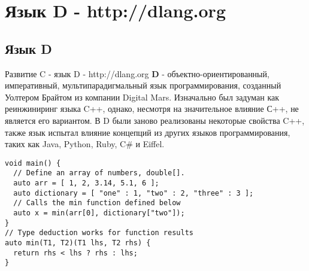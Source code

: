 \section{Язык D - http://dlang.org}
\subsection{Язык D}

\begin{frame}[t,fragile]{Развитие C - язык D - http://dlang.org}
  \textbf{D} - объектно-ориентированный, императивный, мультипарадигмальный язык программирования, 
  созданный Уолтером Брайтом из компании Digital Mars. 
  Изначально был задуман как реинжиниринг языка C++, однако, несмотря на значительное влияние С++, не является его вариантом. 
  В D были заново реализованы некоторые свойства C++, 
  также язык испытал влияние концепций из других языков программирования, таких как Java, Python, Ruby, C\# и Eiffel.

\begin{lstlisting}
void main() {
  // Define an array of numbers, double[].
  auto arr = [ 1, 2, 3.14, 5.1, 6 ];
  auto dictionary = [ "one" : 1, "two" : 2, "three" : 3 ];
  // Calls the min function defined below
  auto x = min(arr[0], dictionary["two"]);
}
// Type deduction works for function results
auto min(T1, T2)(T1 lhs, T2 rhs) {
  return rhs < lhs ? rhs : lhs;
}
\end{lstlisting}


\end{frame}
